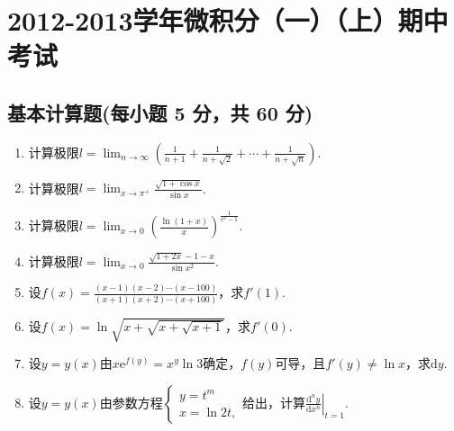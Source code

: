 \documentclass[../Main.tex]{subfiles}
\begin{document}
\chapter{2012-2013学年微积分（一）（上）期中考试}

\section{基本计算题(每小题 5 分，共 60 分)}
\begin{enumerate}
    \item 计算极限$l=\lim_{n\to\infty}\left(\frac{1}{n+1}+\frac{1}{n+\sqrt{2}}+\cdots
              +\frac{1}{n+\sqrt{n}}\right)$.
          \vspace{7em}

    \item 计算极限$l=\lim_{x\to \pi^+}\frac{\sqrt{1+\cos x}}{\sin x}$.
          \vspace{7em}

    \item 计算极限$l=\lim_{x\to 0}\left(\frac{\ln(1+x)}{x}\right)^{\frac{1}{\mathrm{e}^{x}-1}}$.
          \vspace{8em}

    \item 计算极限$l=\lim_{x\to0}\frac{\sqrt{1+2x}-1-x}{\sin x^{2}}$.
          \vspace{8em}

    \item 设$f(x)=\frac{(x-1)(x-2)\cdots(x-100)}{(x+1)(x+2)\cdots(x+100)}$，求$f'
              (1)$.
          \vspace{8em}

    \item 设$f(x)=\ln\sqrt{x+\sqrt{x+\sqrt{x+1}}}$，求$f'(0)$.
          \vspace{7em}

    \item 设$y=y(x)$由$x\mathrm{e}^{f(y)}=x^{y}\ln 3$确定，$f(y)$可导，且$f'(y)\neq
              \ln x$，求$\mathrm{d}y$.
          \vspace{7em}

    \item 设$y=y(x)$由参数方程$\begin{cases}
                  y=t^{m} \\
                  x=\ln 2t,
              \end{cases}$给出，计算$\left.\frac{\mathrm{d}^{n} y}{\mathrm{d}x^{n}}\right
              |_{t=1}$.
          \vspace{8em}


\end{enumerate}
\end{document}
